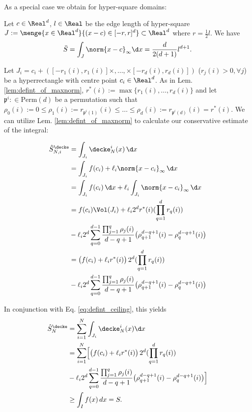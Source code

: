As a special case we obtain for hyper-square domains:
\begin{cor} Let $c \in \Real^d$, $l\in \Real$ be the edge length of hyper-square $J := \menge{x \in \Real^d}{ (x -c) \in [-r,r]^d } \subset \Real^d$ where $r= \frac{1}{2} l$. 
We have \[
\bar S = \int_{J} \norm{x-c}_\infty \d x = \frac{d}{2(d+1)}  l^{d+1}.\]
\end{cor}


 Let $J_i = c_i + ([-r_1(i),r_1(i)]\times,\ldots, \times[-r_d(i),r_d(i)])$ ($r_j(i) >0, \forall j$) be a hyperrectangle with centre point $c_i \in \Real^d$. As in Lem. \ref{lem:defint_of_maxnorm},  $r^{*}(i) := \max\{r_1(i),\ldots,r_d(i) \}$ and let $\mathfrak p^i: \in \text{Perm}(d)$ be a permutation such that $\rho_0(i) := 0 \leq \rho_1(i) := r_{\mathfrak p^i(1)}(i)\leq \ldots \leq \rho_d(i) := r_{\mathfrak p^i(d)}(i) =r^{*}(i)$. We can utilize Lem. \ref{lem:defint_of_maxnorm} to calculate our conservative estimate of the integral:

\begin{align*}
%
\hat S_{N,i}^\decke &=\int_{J_i} \decke^i_N( x) \, \d x \\
%
& = \int_{J_i} f(c_i) + \ell_i \norm{x-c_i}_{\infty} \, \d x \\
%
& = \int_{J_i} f(c_i) \, \d x + \ell_i \int_{J_i}  \norm{x-c_i}_{\infty} \, \d x \\
%
& = f(c_i) \Vol(J_i) + \ell_i 2^d r^{*}(i) (\prod_{q=1}^d r_q(i)) \\
&- \ell_i 2^d \sum_{q=0}^{d-1} \frac{\prod_{j=1}^{q} \rho_j(i) }{d-q+1} \bigl(\rho_{q+1}^{d-q+1}(i) - \rho_{q}^{d-q+1}(i) \bigr) \\
%
& = \bigl(f(c_i) + \ell_i r^{*}(i) \bigr) \,2^d (\prod_{q=1}^d r_q(i)) \\
&- \ell_i 2^d \sum_{q=0}^{d-1} \frac{\prod_{j=1}^{q} \rho_j(i) }{d-q+1} \bigl(\rho_{q+1}^{d-q+1}(i) - \rho_{q}^{d-q+1}(i) \bigr) \\
\end{align*}

In conjunction with Eq. \ref{eq:defint_ceiling}, this yields 
\begin{align} \label{eq:quadupper_multidim}
\hat S_N^\decke &= \sum_{i=1}^N \int_{J_i} \decke^i_N( x) \d x \\
&= \sum_{i=1}^N  \Bigl[ \bigl(f(c_i) + \ell_i r^{*}(i) \bigr) \,2^d (\prod_{q=1}^d r_q(i)) \\
&- \ell_i 2^d \sum_{q=0}^{d-1} \frac{\prod_{j=1}^{q} \rho_j(i) }{d-q+1} \bigl(\rho_{q+1}^{d-q+1}(i) - \rho_{q}^{d-q+1}(i) \bigr) \Bigr]\\
& \geq \int_I f(x) \,dx = S.
\end{align}


